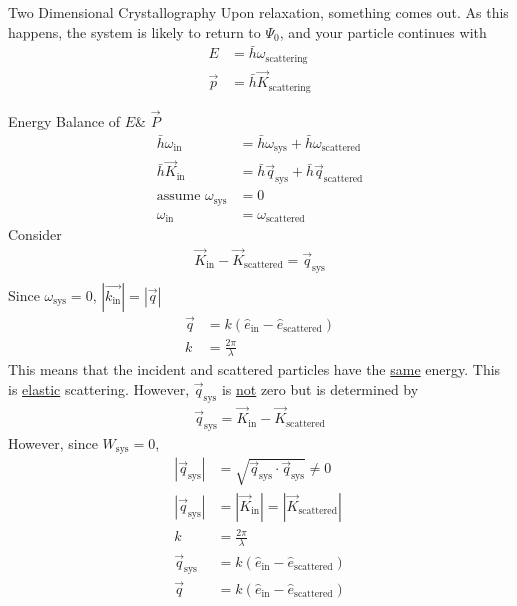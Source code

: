 \documentclass{article}
\newcommand{\norm}[1]{\left|#1\right|}
\begin{document}
\begin{section}{Two Dimensional Crystallography}
Upon relaxation, something comes out. As this happens, the system is likely to return to $\Psi_0$, and your particle continues with 
\begin{align*}
	E &= \bar{h}\omega_\text{scattering}\\
	\vec{p} &= \bar{h}\vec{K}_\text{scattering}
\end{align*}
\begin{subsection}{Energy}
	Balance of $E$\& $\vec{P}$
	\begin{align*}
		\bar{h}\omega_\text{in} &= \bar{h}\omega_\text{sys} + \bar{h}\omega_\text{scattered}\\
		\bar{h}\vec{K}_\text{in} &= \bar{h}\vec{q}_\text{sys} + \bar{h}\vec{q}_\text{scattered}\\
		\text{assume }\omega_\text{sys} &= 0\\
		\omega_\text{in} &= \omega_\text{scattered}
	\end{align*}
	Consider
	\begin{align*}
		\vec{K}_\text{in} - \vec{K}_\text{scattered} = \vec{q}_\text{sys}\\
	\end{align*}
	Since $\omega_\text{sys} = 0$, $\norm{\vec{k_\text{in}}} = \norm{\vec{q}}$
	\begin{align*}
		\vec{q} &= k(\hat{e}_\text{in} - \hat{e}_\text{scattered})\\
		k &= \frac{2\pi}{\lambda}
	\end{align*}
	This means that the incident and scattered particles have the \underline{same} energy. This is \underline{elastic} scattering.
	However, $\vec{q}_\text{sys}$ is \underline{not} zero but is determined by 
	\begin{align*}
		\vec{q}_\text{sys} = \vec{K}_\text{in} - \vec{K}_\text{scattered}
	\end{align*}
	However, since $W_\text{sys} = 0$,
	\begin{align*}
		|\vec{q}_\text{sys} | &= \sqrt{\vec{q}_\text{sys}\cdot \vec{q}_\text{sys}}\neq 0\\
		|\vec{q}_\text{sys} | &= | \vec{K}_\text{in} | = | \vec{K}_\text{scattered}|\\
		k &= \frac{2\pi}{\lambda}\\
		\vec{q}_\text{sys} &= k(\hat{e}_\text{in} - \hat{e}_\text{scattered})\\
		\vec{q} &= k(\hat{e}_\text{in} - \hat{e}_\text{scattered})
	\end{align*}


\end{subsection}
\end{section}
\end{document}
